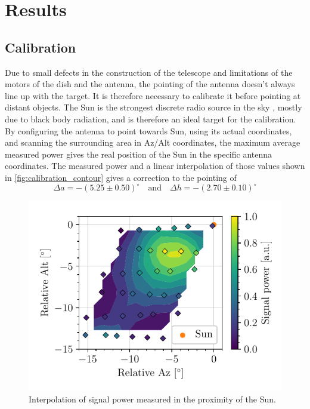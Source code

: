 \section{Results}
\subsection{Calibration} \label{sec:calibration}
Due to small defects in the construction of the telescope and limitations of the motors of the dish and the antenna, the pointing of the antenna doesn't always line up with the target. It is therefore necessary to calibrate it before pointing at distant objects. The Sun is the strongest discrete radio source in the sky \cite{burke_introduction_2013}, mostly due to black body radiation, and is therefore an ideal target for the calibration.
By configuring the antenna to point towards Sun, using its actual coordinates, and scanning the surrounding area in Az/Alt coordinates, the maximum average measured power gives the real position of the Sun in the specific antenna coordinates. The measured power and a linear interpolation of those values shown in \autoref{fig:calibration_contour} gives a correction to the pointing of
\begin{equation} \label{eq:offset}
    \Delta a = -(5.25 \pm 0.50)^\circ \quad \textrm{and} \quad \Delta h = -(2.70 \pm 0.10)^\circ
\end{equation}
\begin{figure}[htbp]
    \centering
    \includegraphics[scale=1]{figures/calibration_contour.pdf}
    \caption{Interpolation of signal power measured in the proximity of the Sun.}
    \label{fig:calibration_contour}
\end{figure}

